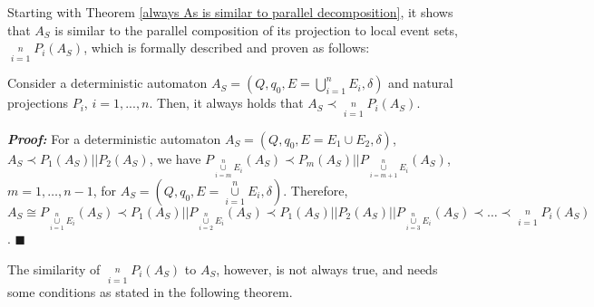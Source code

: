 Starting with Theorem \ref{always As is similar to parallel decomposition}, it shows that $A_S$ is similar to the parallel composition of its projection to local event sets,
 $\mathop {||}\limits_{i = 1}^n P_i \left( {A_S }
\right)$, which is formally described and proven as follows:

\begin{theorem}\label{always As is similar to parallel decomposition}
Consider a deterministic automaton $A_S  = \left( {Q,q_0 ,E =
\bigcup\limits_{i = 1}^n {E_i ,\delta } } \right)$ and natural
projections $P_i$, $i=1,...,n$.
Then, it always holds that $A_S \prec \mathop {||}\limits_{i = 1}^n
P_i \left( {A_S } \right)$.
\end{theorem}

\textbf{\emph{Proof:}}
For a
deterministic automaton $A_S = (Q, q_0, E = E_1\cup E_2, \delta)$,
$A_S \prec P_1(A_S)||P_2(A_S)$, we have $P_{\mathop
{\cup}\limits_{i = m}^n E_i}(A_S)\prec P_m(A_S)||P_{\mathop
{\cup}\limits_{i = m+1}^n E_i}(A_S)$, $m = 1,\ldots, n-1$, for $A_S
= (Q, q_0, E = \mathop {\cup}\limits_{i = 1}^n E_i, \delta)$.
Therefore, $A_S \cong  P_{\mathop {\cup}\limits_{i=1}^n
E_i}(A_S)\prec P_1(A_S)||P_{\mathop {\cup}\limits_{i = 2}^n
E_i}(A_S)\prec P_1(A_S)||P_2(A_S)||P_{\mathop {\cup}\limits_{i =
3}^n E_i}(A_S)\prec \ldots \prec \mathop {||}\limits_{i = 1}^n
P_i(A_S)$. $\blacksquare$


The similarity of $\mathop {||}\limits_{i = 1}^n P_i \left( {A_S }
\right)$ to $A_S$, however, is not always true, and needs some
conditions as stated in the following theorem.

